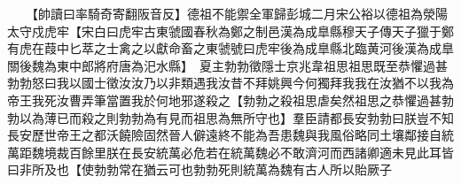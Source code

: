 　　【帥讀曰率騎奇寄翻阪音反】德祖不能禦全軍歸彭城二月宋公裕以德祖為滎陽太守戍虎牢【宋白曰虎牢古東虢國春秋為鄭之制邑漢為成臯縣穆天子傳天子獵于鄭有虎在葭中匕萃之士禽之以獻命畜之東虢號曰虎牢後為成臯縣北臨黄河後漢為成臯關後魏為東中郎將府唐為汜水縣】　夏主勃勃徵隱士京兆韋祖思祖思既至恭懼過甚勃勃怒曰我以國士徵汝汝乃以非類遇我汝昔不拜姚興今何獨拜我我在汝猶不以我為帝王我死汝曹弄筆當置我於何地邪遂殺之【勃勃之殺祖思虐矣然祖思之恭懼過甚勃勃以為薄已而殺之則勃勃為有見而祖思為無所守也】羣臣請都長安勃勃曰朕豈不知長安歷世帝王之都沃饒險固然晉人僻遠終不能為吾患魏與我風俗略同土壤鄰接自統萬距魏境裁百餘里朕在長安統萬必危若在統萬魏必不敢濟河而西諸卿適未見此耳皆曰非所及也【使勃勃常在猶云可也勃勃死則統萬為魏有古人所以貽厥子